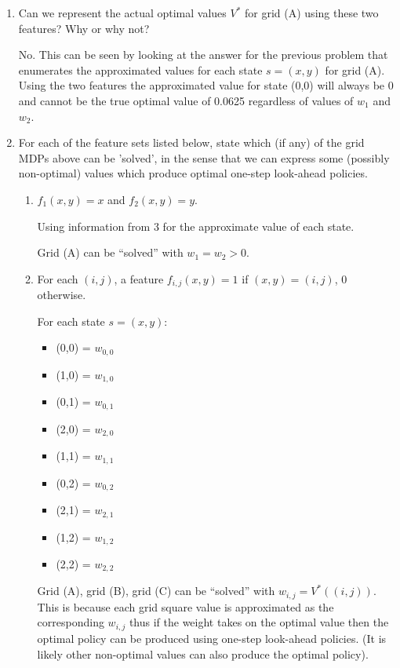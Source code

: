 \documentclass[12pt]{article}
\begin{document}
\begin{enumerate}
\item Can we represent the actual optimal values $V^*$ for grid (A)
  using these two features?  Why or why not?

  No. 
  This can be seen by looking at the answer for the previous problem that enumerates the approximated values for each state $s = (x, y)$ for grid (A).
  Using the two features the approximated value for state (0,0) will always be 0 and cannot be the true optimal value of 0.0625 regardless of values of $w_1$ and $w_2$.

\clearpage

\item For each of the feature sets listed below, state which (if any)
  of the grid MDPs above can be 'solved', in the sense that we can
  express some (possibly non-optimal) values which produce optimal
  one-step look-ahead policies.

  \begin{enumerate}

  \item $f_1(x, y) = x$ and $f_2(x, y) = y$.

  Using information from 3 for the approximate value of each state.

  Grid (A) can be ``solved'' with $w_1 = w_2 > 0$. 
  
  \item For each $(i, j)$, a feature $f_{i,j}(x, y) = 1$ if $(x, y) = (i, j)$, 0 otherwise.

  For each state $s = (x, y)$: 
  \begin{itemize}
    \item (0,0) = $w_{0,0}$
    \item (1,0) = $w_{1,0}$
    \item (0,1) = $w_{0,1}$
    \item (2,0) = $w_{2,0}$
    \item (1,1) = $w_{1,1}$
    \item (0,2) = $w_{0,2}$
    \item (2,1) = $w_{2,1}$
    \item (1,2) = $w_{1,2}$
    \item (2,2) = $w_{2,2}$
  \end{itemize}

  Grid (A), grid (B), grid (C) can be ``solved'' with $w_{i,j} = V^*((i,j))$.
  This is because each grid square value is approximated as the corresponding $w_{i,j}$ thus if the weight takes on the optimal value then the optimal policy can be produced using one-step look-ahead policies. (It is likely other non-optimal values can also produce the optimal policy). %


\end{enumerate}
\end{enumerate}
\end{document}
